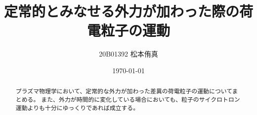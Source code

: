 
\newcommand{\varParallel}{\def\@varParallel{/\kern-.2em /}%
  \mathchoice%
  {\@varParallel}%
  {\textstyle\@varParallel}%
  {\scriptscriptstyle\@varParallel}%
  {\scriptscriptstyle\@varParallel}}
\title{定常的とみなせる外力が加わった際の荷電粒子の運動}
\author{20B01392 松本侑真}
\date{\today}

\maketitle
\begin{abstract}
	プラズマ物理学において、定常的な外力が加わった差異の荷電粒子の運動についてまとめる。
	また、外力が時間的に変化している場合においても、粒子のサイクロトロン運動よりも十分にゆっくりであれば成立する。
\end{abstract}
\tableofcontents
\newpage

